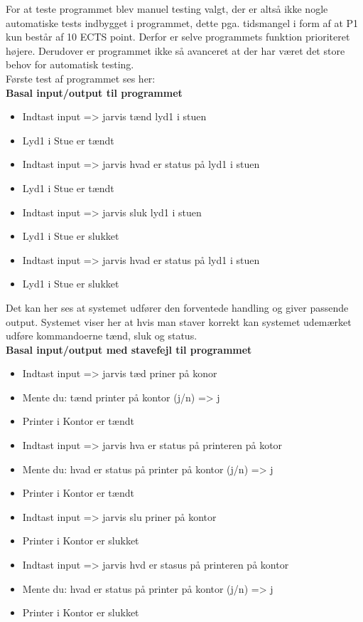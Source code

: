 For at teste programmet blev manuel testing valgt, der er altså ikke nogle automatiske tests indbygget i programmet, dette pga. tidsmangel i form af at P1 kun består af 10 ECTS point. Derfor er selve programmets funktion prioriteret højere. Derudover er programmet ikke så avanceret at der har været det store behov for automatisk testing.\\
Første test af programmet ses her:\\

{\bf Basal input/output til programmet}
\begin{itemize}[itemsep=0ex,topsep=1ex]
    \item Indtast input => jarvis tænd lyd1 i stuen
    \item Lyd1 i Stue er tændt
    \item Indtast input => jarvis hvad er status på lyd1 i stuen
    \item Lyd1 i Stue er tændt
    \item Indtast input => jarvis sluk lyd1 i stuen
    \item Lyd1 i Stue er slukket
    \item Indtast input => jarvis hvad er status på lyd1 i stuen
    \item Lyd1 i Stue er slukket
\end{itemize} 

Det kan her ses at systemet udfører den forventede handling og giver passende output. Systemet viser her at hvis man staver korrekt kan systemet udemærket udføre kommandoerne tænd, sluk og status.\\

{\bf Basal input/output med stavefejl til programmet}
\begin{itemize}[itemsep=0ex,topsep=1ex]
    \item Indtast input => jarvis tæd priner på konor
    \item Mente du: tænd printer på kontor (j/n) => j
    \item Printer i Kontor er tændt
    \item Indtast input => jarvis hva er status på printeren på kotor
    \item Mente du: hvad er status på printer på kontor (j/n) => j
    \item Printer i Kontor er tændt
    \item Indtast input => jarvis slu priner på kontor
    \item Printer i Kontor er slukket
    \item Indtast input => jarvis hvd er stasus på printeren på kontor
    \item Mente du: hvad er status på printer på kontor (j/n) => j
    \item Printer i Kontor er slukket
\end{itemize}

